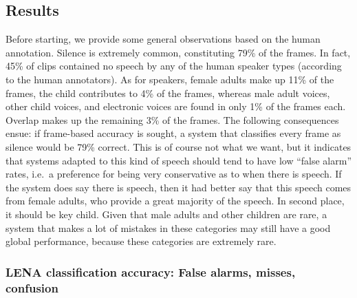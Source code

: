 \documentclass[english,floatsintext,man]{apa6}
\begin{document}
\subsection{Results}\label{results}

Before starting, we provide some general observations based on the human
annotation. Silence is extremely common, constituting 79\% of the
frames. In fact, 45\% of clips contained no speech by any of the human
speaker types (according to the human annotators). As for speakers,
female adults make up 11\% of the frames, the child contributes to 4\%
of the frames, whereas male adult voices, other child voices, and
electronic voices are found in only 1\% of the frames each. Overlap
makes up the remaining 3\% of the frames. The following consequences
ensue: if frame-based accuracy is sought, a system that classifies every
frame as silence would be 79\% correct. This is of course not what we
want, but it indicates that systems adapted to this kind of speech
should tend to have low \enquote{false alarm} rates, i.e.~a preference
for being very conservative as to when there is speech. If the system
does say there is speech, then it had better say that this speech comes
from female adults, who provide a great majority of the speech. In
second place, it should be key child. Given that male adults and other
children are rare, a system that makes a lot of mistakes in these
categories may still have a good global performance, because these
categories are extremely rare.

\subsubsection{LENA classification accuracy: False alarms, misses,
confusion}\label{lena-classification-accuracy-false-alarms-misses-confusion}
\end{document}
